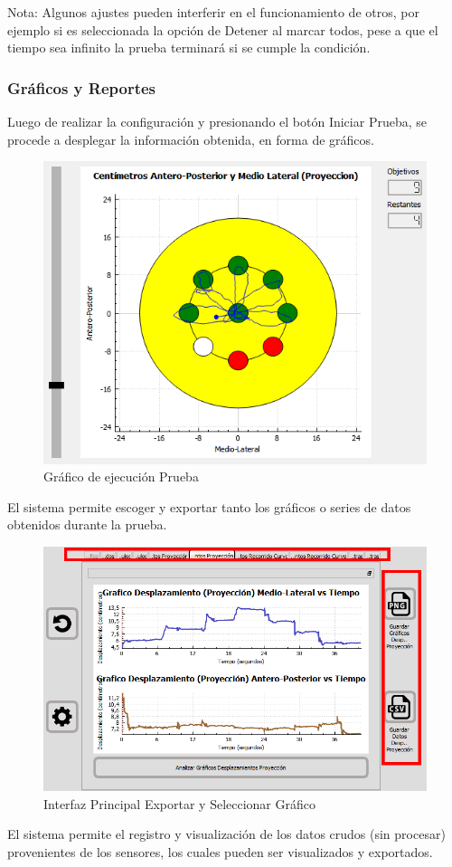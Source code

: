 \documentclass[12pt,a4paper]{article}
\begin{document}
Nota: Algunos ajustes pueden interferir en el funcionamiento de otros, por ejemplo si es seleccionada la opción de Detener al marcar todos, pese a que el tiempo sea infinito la prueba terminará si se cumple la condición.

\newpage
\subsubsection{Gráficos y Reportes}
Luego de realizar la configuración y presionando el botón Iniciar Prueba, se procede a desplegar la información obtenida, en forma de gráficos.

\begin{figure}[H]
	\centering
	\includegraphics[scale=0.76]{images/graficosyreportes/graficoPrincipal}
	\caption{Gráfico de ejecución Prueba}
	\label{fig:graficoPrincipal}
\end{figure}

El sistema permite escoger y exportar tanto los gráficos o series de datos obtenidos durante la prueba. 
\begin{figure}[H]
	\centering
	\includegraphics[scale=0.6]{images/graficosyreportes/graficos}
	\caption{Interfaz Principal Exportar y Seleccionar Gráfico}
	\label{fig:exportargrafico}
\end{figure}
El sistema permite el registro y visualización de los datos crudos (sin procesar) provenientes de los sensores, los cuales pueden ser visualizados y exportados.
\end{document}
